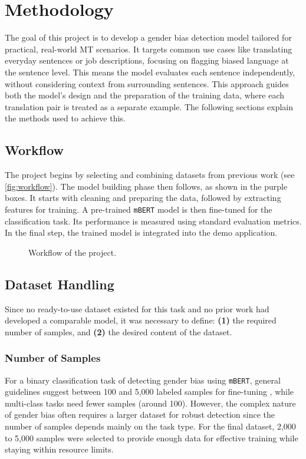 \chapter{Methodology}
The goal of this project is to develop a gender bias detection model tailored for practical, real-world MT scenarios. It targets common use cases like translating everyday sentences or job descriptions, focusing on flagging biased language at the sentence level. This means the model evaluates each sentence independently, without considering context from surrounding sentences. This approach guides both the model’s design and the preparation of the training data, where each translation pair is treated as a separate example. The following sections explain the methods used to achieve this.

\section{Workflow}
The project begins by selecting and combining datasets from previous work (see \autoref{fig:workflow}). The model building phase then follows, as shown in the purple boxes. It starts with cleaning and preparing the data, followed by extracting features for training. A pre-trained \texttt{mBERT} model is then fine-tuned for the classification task. Its performance is measured using standard evaluation metrics. In the final step, the trained model is integrated  into the demo application.

\vspace{1cm} 
\begin{figure}[htb]
    \centering
    \scalebox{0.8}{}
    \caption{Workflow of the project.}
    \label{fig:workflow}
\end{figure}
\vspace{1cm} 

\section{Dataset Handling}
    Since no ready-to-use dataset existed for this task and no prior work had developed a comparable model, it was necessary to define: \textbf{(1)} the required number of samples, and \textbf{(2)} the desired content of the dataset.

    \subsection{Number of Samples}
    For a binary classification task of detecting gender bias using \texttt{mBERT}, general guidelines suggest between 100 and 5,000 labeled samples for fine-tuning \parencite{pecherComparingSpecialisedSmall2024}, while multi-class tasks need fewer samples (around 100). However, the complex nature of gender bias often requires a larger dataset for robust detection since the number of samples depends mainly on the task type. For the final dataset, 2,000 to 5,000 samples were selected to provide enough data for effective training while staying within resource limits.

